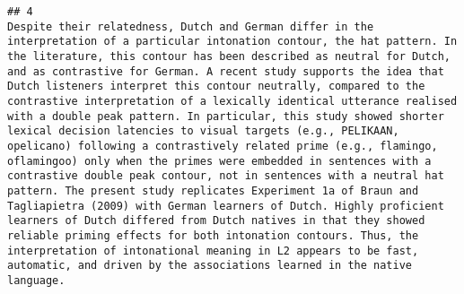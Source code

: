 \documentclass[
  english,
  man]{apa6}
\begin{document}
\begin{verbatim}
## 4                                                                                                                                                                                                                                                                                                                                                                                                                                                                                                                                                                                                                                                                                                                                                                                                                                                                                                                                                                                                                                                                                                                                                                                                                                                                                                                                                                                                                                                                                    Despite their relatedness, Dutch and German differ in the interpretation of a particular intonation contour, the hat pattern. In the literature, this contour has been described as neutral for Dutch, and as contrastive for German. A recent study supports the idea that Dutch listeners interpret this contour neutrally, compared to the contrastive interpretation of a lexically identical utterance realised with a double peak pattern. In particular, this study showed shorter lexical decision latencies to visual targets (e.g., PELIKAAN, opelicano) following a contrastively related prime (e.g., flamingo, oflamingoo) only when the primes were embedded in sentences with a contrastive double peak contour, not in sentences with a neutral hat pattern. The present study replicates Experiment 1a of Braun and Tagliapietra (2009) with German learners of Dutch. Highly proficient learners of Dutch differed from Dutch natives in that they showed reliable priming effects for both intonation contours. Thus, the interpretation of intonational meaning in L2 appears to be fast, automatic, and driven by the associations learned in the native language.

\end{verbatim}
\end{document}
